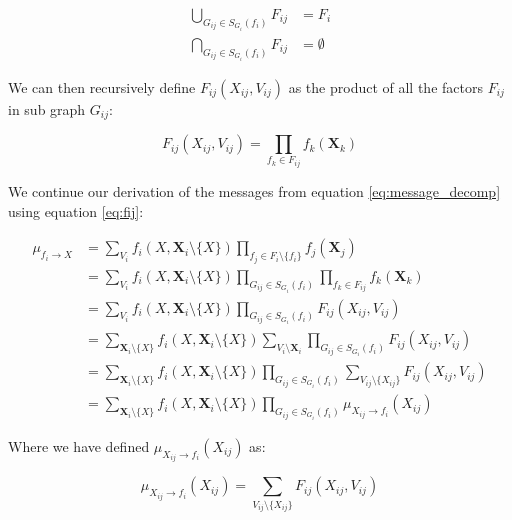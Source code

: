 \begin{equation}\begin{split}
\bigcup_{G_{ij} \in S_{G_i}(f_i)} F_{ij} &= F_i \\
\bigcap_{G_{ij} \in S_{G_i}(f_i)} F_{ij} &= \emptyset
\end{split}\end{equation}

\noindent
We can then recursively define $F_{ij}(X_{ij}, V_{ij})$
as the product of all the factors $F_{ij}$ in sub graph $G_{ij}$:

\begin{equation}\label{eq:fij}
F_{ij}(X_{ij}, V_{ij}) = \prod_{f_{k} \in F_{ij}}f_{k}(\textbf{X}_{k})
\end{equation}

\noindent
We continue our derivation of the messages from equation 
\ref{eq:message_decomp} using equation \ref{eq:fij}:

\begin{equation}\label{eq:message_var_to_fact_der}\begin{split}
\mu_{f_i \rightarrow X} 
	&= \sum_{V_i}f_i(X, \textbf{X}_i \setminus \{X\}) 
		\prod_{f_j \in F_i \setminus \{f_i\}} f_j(\textbf{X}_j)\\
	&= \sum_{V_i}f_i(X, \textbf{X}_i \setminus \{X\}) 
		\prod_{G_{ij} \in S_{G_i}(f_i)} \prod_{f_{k} \in F_{ij} }
			f_{k}(\textbf{X}_k)\\
	&= \sum_{V_i}f_i(X, \textbf{X}_i \setminus \{X\}) 
		\prod_{G_{ij} \in S_{G_i}(f_i)} F_{ij}(X_{ij}, V_{ij})\\
	&= \sum_{\textbf{X}_i\setminus \{X\}} f_i(X, \textbf{X}_i \setminus \{X\}) 
		\sum_{V_i \setminus \textbf{X}_i}\prod_{G_{ij} \in S_{G_i}(f_i)} 
			F_{ij}(X_{ij}, V_{ij})\\
	&= \sum_{\textbf{X}_i\setminus \{X\}} f_i(X, \textbf{X}_i \setminus \{X\}) 
		\prod_{G_{ij} \in S_{G_i}(f_i)} \sum_{V_{ij} \setminus \{X_{ij}\}}
			F_{ij}(X_{ij}, V_{ij})\\
	&= \sum_{\textbf{X}_i\setminus \{X\}} f_i(X, \textbf{X}_i \setminus \{X\}) 
		\prod_{G_{ij} \in S_{G_i}(f_i)} \mu_{X_{ij} \rightarrow f_i}(X_{ij})
\end{split}\end{equation}

\noindent
Where we have defined $\mu_{X_{ij} \rightarrow f_i}(X_{ij})$ as:

\begin{equation}\label{eq:message_var_to_fact}
\mu_{X_{ij} \rightarrow f_i}(X_{ij}) = \sum_{V_{ij} \setminus \{X_{ij}\}}
			F_{ij}(X_{ij}, V_{ij})
\end{equation}

